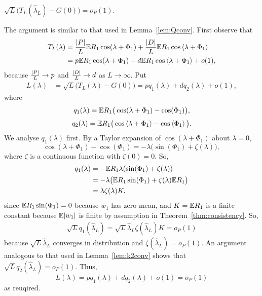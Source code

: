 \documentclass[journal]{IEEEtran}
\begin{document}
\begin{lemma}\label{lem:HLtoG} $\sqrt{L}\big( T_L(\hat{\lambda}_L) - G(0) \big) = o_P(1)$.
\end{lemma}
\begin{IEEEproof}
The argument is similar to that used in Lemma~\ref{lem:Qconv}.  First observe that
\begin{align*}
T_L(\lambda) &= \frac{{\vert P \vert}}{L}{\mathbb E} R_1\cos(\lambda + \Phi_1) + \frac{{\vert D \vert}}{L} {\mathbb E} R_1\cos\left\langle \lambda + \Phi_1 \right\rangle \\
&=  p {\mathbb E} R_1\cos(\lambda + \Phi_1) + d{\mathbb E} R_1\cos\left\langle \lambda + \Phi_1 \right\rangle + o(1),
\end{align*}
because $\frac{{\vert P \vert}}{L} \rightarrow p$ and $\frac{{\vert D \vert}}{L} \rightarrow d$ as $L\rightarrow\infty$. Put
\begin{align*}
L(\lambda) &= \sqrt{L}\big( T_L(\lambda) - G(0) \big) = p q_1(\lambda) + d q_2(\lambda) + o(1),
\end{align*}
where
\[
q_1(\lambda) = {\mathbb E} R_1\big( \cos(\lambda + \Phi_1) - \cos(\Phi_1) \big),
\]
\begin{equation}
q_2(\lambda) = {\mathbb E} R_1\big( \cos\left\langle \lambda + \Phi_1 \right\rangle - \cos\left\langle \Phi_1 \right\rangle \big). \label{eq:q2def}
\end{equation}
We analyse $q_1(\lambda)$ first.  By a Taylor expansion of $\cos(\lambda + \Phi_1)$ about $\lambda = 0$,
\[
\cos(\lambda + \Phi_1) - \cos(\Phi_1) = -\lambda \big( \sin(\Phi_1) + \zeta(\lambda) \big),
\]
where $\zeta$ is a continuous function with $\zeta(0) = 0$. So,
\begin{align*}
q_1(\lambda) &= -{\mathbb E} R_1\lambda(\sin(\Phi_1) +  \zeta(\lambda)) \\
&= -\lambda \big( {\mathbb E} R_1\sin(\Phi_1) +  \zeta(\lambda) {\mathbb E} R_1 \big) \\
&= \lambda \zeta(\lambda) K,
\end{align*}
since ${\mathbb E} R_1\sin(\Phi_1) = 0$ because $w_1$ has zero mean,  and $K = {\mathbb E} R_1$ is a finite constant because ${\mathbb E}{\vert w_1 \vert}$ is finite by assumption in Theorem~\ref{thm:consistency}.  So, 
\begin{align*}
\sqrt{L} q_1(\hat{\lambda}_L) = \sqrt{L} \hat{\lambda}_L \zeta(\hat{\lambda}_L) K = o_P(1)
\end{align*}
because $\sqrt{L} \hat{\lambda}_L$ converges in distribution and $\zeta(\hat{\lambda}_L) = o_P(1)$.  An argument analogous to that used in Lemma~\ref{lem:k2conv} shows that $\sqrt{L} q_2(\hat{\lambda}_L) = o_P(1)$.  Thus, 
\[
L(\lambda) = p q_1(\lambda) + d q_2(\lambda) + o(1) = o_P(1)
\]
as reuqired.
\end{IEEEproof}
\end{document}
